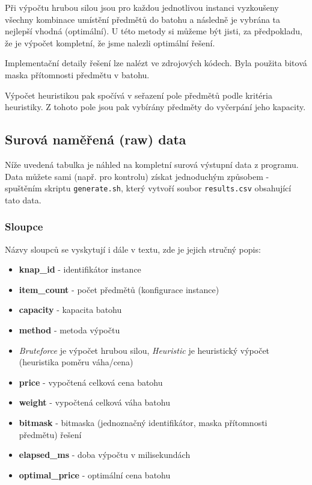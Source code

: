\documentclass[11pt]{article}
\providecommand{\tightlist}{%
      \setlength{\itemsep}{0pt}\setlength{\parskip}{0pt}}
\begin{document}
Při výpočtu hrubou silou jsou pro každou jednotlivou instanci vyzkoušeny
všechny kombinace umístění předmětů do batohu a následně je vybrána ta
nejlepší vhodná (optimální). U této metody si můžeme být jisti, za
předpokladu, že je výpočet kompletní, že jsme nalezli optimální řešení.

Implementační detaily řešení lze nalézt ve zdrojových kódech. Byla
použita bitová maska přítomnosti předmětu v batohu.

Výpočet heuristikou pak spočívá v seřazení pole předmětů podle kritéria
heuristiky. Z tohoto pole jsou pak vybírány předměty do vyčerpání jeho
kapacity.

    \subsection{Surová naměřená (raw)
data}\label{surovuxe1-namux11bux159enuxe1-raw-data}

Níže uvedená tabulka je náhled na kompletní surová výstupní data z
programu. Data můžete sami (např. pro kontrolu) získat jednoduchým
způsobem - spuštěním skriptu \texttt{generate.sh}, který vytvoří soubor
\texttt{results.csv} obsahující tato data.


\newpage

\subsubsection{Sloupce}\label{sloupce}

Názvy sloupců se vyskytují i dále v textu, zde je jejich stručný popis:

\begin{itemize}
\tightlist
\item
  \textbf{knap\_id} - identifikátor instance
\item
  \textbf{item\_count} - počet předmětů (konfigurace instance)
\item
  \textbf{capacity} - kapacita batohu
\item
  \textbf{method} - metoda výpočtu
\item
  \emph{Bruteforce} je výpočet hrubou silou, \emph{Heuristic} je
  heuristický výpočet (heuristika poměru váha/cena)
\item
  \textbf{price} - vypočtená celková cena batohu
\item
  \textbf{weight} - vypočtená celková váha batohu
\item
  \textbf{bitmask} - bitmaska (jednoznačný identifikátor, maska
  přítomnosti předmětu) řešení
\item
  \textbf{elapsed\_ms} - doba výpočtu v milisekundách
\item
  \textbf{optimal\_price} - optimální cena batohu
\end{itemize}
\end{document}

